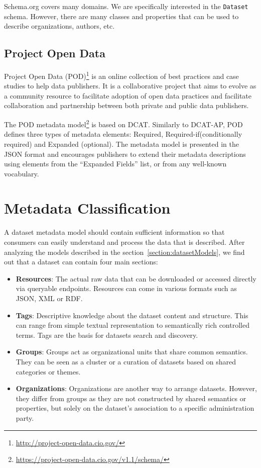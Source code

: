 Schema.org covers many domains. We are specifically interested in the \texttt{Dataset} schema. However, there are many classes and properties that can be used to describe organizations, authors, etc.

\subsection{Project Open Data}
Project Open Data (POD)\footnote{\url{http://project-open-data.cio.gov/}} is an online collection of best practices and case studies to help data publishers. It is a collaborative project that aims to evolve as a community resource to facilitate adoption of open data practices and facilitate collaboration and partnership between both private and public data publishers.

The POD metadata model\footnote{\url{https://project-open-data.cio.gov/v1.1/schema/}} is based on DCAT. Similarly to DCAT-AP, POD defines three types of metadata elements: Required, Required-if(conditionally required) and Expanded (optional). The metadata model is presented in the JSON format and encourages publishers to extend their metadata descriptions using elements from the ``Expanded Fields'' list, or from any well-known vocabulary.


\section{Metadata Classification}
\label{section:metadata}
A dataset metadata model should contain sufficient information so that consumers can easily understand and process the data that is described. After analyzing the models described in the section~\ref{section:datasetModels}, we find out that a dataset can contain four main sections:
\begin{itemize}
  \item \textbf{Resources}: The actual raw data that can be downloaded or accessed directly via queryable endpoints. Resources can come in various formats such as JSON, XML or RDF.
  \item \textbf{Tags}: Descriptive knowledge about the dataset content and structure. This can range from simple textual representation to semantically rich controlled terms. Tags are the basis for datasets search and discovery.
  \item \textbf{Groups}: Groups act as organizational units that share common semantics. They can be seen as a cluster or a curation of datasets based on shared categories or themes.
  \item \textbf{Organizations}: Organizations are another way to arrange datasets. However, they differ from groups as they are not constructed by shared semantics or properties, but solely on the dataset's association to a specific administration party.
\end{itemize}


